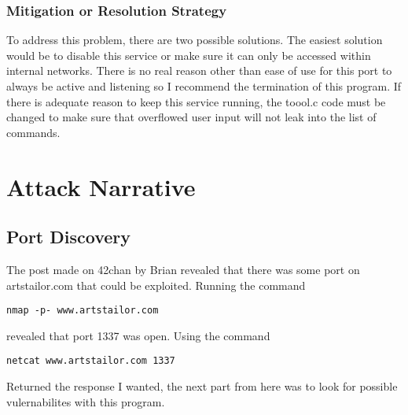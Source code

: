 \documentclass[notitlepage]{article}
\begin{document}
    \subsubsection*{Mitigation or Resolution Strategy}
    To address this problem, there are two possible solutions. The easiest solution would be to disable this service or make sure it can only be accessed
    within internal networks. There is no real reason other than ease of use for this port to always be active and listening so I recommend the termination of
    this program. If there is adequate reason to keep this service running, the toool.c code must be changed to make sure that overflowed user input will not
    leak into the list of commands.



\section{Attack Narrative}

    \subsection{Port Discovery}
        The post made on 42chan by Brian revealed that there was some port on artstailor.com that could be exploited. Running the command
        \begin{verbatim}
nmap -p- www.artstailor.com    
        \end{verbatim}
        revealed that port 1337 was open. Using the command
        \begin{verbatim}
netcat www.artstailor.com 1337    
        \end{verbatim}
        Returned the response I wanted, the next part from here was to look for possible vulernabilites with this program.
\end{document}
